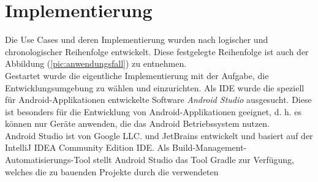 \section{Implementierung}
\label{chap:implementierung}
Die Use Cases und deren Implementierung wurden nach logischer und chronologischer Reihenfolge entwickelt. %
Diese festgelegte Reihenfolge ist auch der Abbildung (\ref{pic:anwendungsfall}) zu entnehmen. 
\\ 
\linebreak
Gestartet wurde die eigentliche Implementierung mit der Aufgabe, die Entwicklungsumgebung zu wählen und einzurichten. 
Als \ac{IDE} wurde die speziell für Android-Applikationen entwickelte Software \textit{Android Studio} ausgesucht. Diese ist besonders für die Entwicklung von 
Android-Applikationen geeignet, d. h. es können nur Geräte anwenden, die das Android Betriebssystem nutzen. 
\\
Android Studio ist von Google LLC. und JetBrains entwickelt und basiert auf der IntelliJ IDEA Community Edition \acs{IDE}. Als 
Build-Management-Automatisierungs-Tool stellt Android Studio das Tool Gradle zur Verfügung, welches die zu bauenden Projekte durch die verwendeten 
